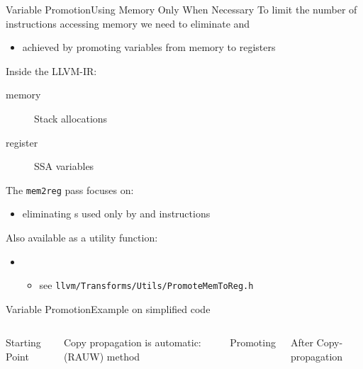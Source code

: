 \begin{frame}{Variable Promotion}{Using Memory Only When Necessary}
To limit the number of instructions accessing memory we need to eliminate  and 
\begin{itemize}
\item achieved by \alert{promoting} variables from memory to registers
\end{itemize}

\vfill
Inside the LLVM-IR:
\begin{description}
\item[memory] Stack allocations \\
\item[register] SSA variables \\
\end{description}

\vfill
The \texttt{mem2reg} pass focuses on:
\begin{itemize}
\item eliminating s used only by  and
       instructions
\end{itemize}

Also available as a utility function:
\begin{itemize}
\item {}\\
\begin{itemize}
\item see \texttt{llvm/Transforms/Utils/PromoteMemToReg.h}
\end{itemize}
\end{itemize}
\end{frame}


\begin{frame}{Variable Promotion}{Example on simplified code}
\begin{columns}[t]
\begin{block}{Starting Point}
\end{block}

Copy propagation is automatic:  (RAUW) method

\begin{block}{Promoting }
\end{block}

\begin{block}{After Copy-propagation}
\end{block}

\end{columns}
\end{frame}


